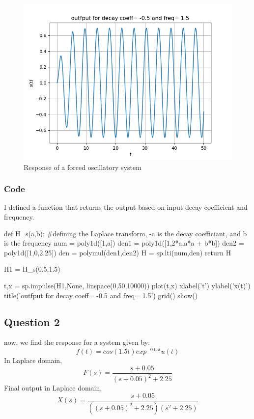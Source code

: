 \documentclass[11pt]{article}
\begin{document}
\begin{figure}[H]
    \centering
    \includegraphics[scale = 1]{Figure_1.png}
    \caption{Response of a forced oscillatory system}
\end{figure}

\subsubsection{Code}
I defined a function that returns the output based on input decay coefficient and frequency.
\begin{python}
def H_s(a,b): #defining the Laplace transform, -a is the decay coefficiant, and b is the frequency
	num = poly1d([1,a])
	den1 = poly1d([1,2*a,a*a + b*b])
	den2 = poly1d([1,0,2.25])
	den = polymul(den1,den2)
	H = sp.lti(num,den)
	return H

H1 = H_s(0.5,1.5)

t,x = sp.impulse(H1,None, linspace(0,50,10000))
plot(t,x)
xlabel('t')
ylabel('x(t)')
title('outfput for decay coeff= -0.5 and freq= 1.5')
grid()
show()

\end{python}

\subsection{Question 2}
now, we find the response for a system given by:
\begin{equation}
    f(t) = cos(1.5t)exp^{-0.05t}u(t)
\end{equation}
In Laplace domain,
\begin{equation}
    F(s) = \frac{s+0.05}{(s+0.05)^2+2.25}
\end{equation}
Final output in Laplace domain,
\begin{equation}
    X(s) = \frac{s+0.05}{((s+0.05)^2+2.25)(s^2+2.25)}
\end{equation}
\end{document}
